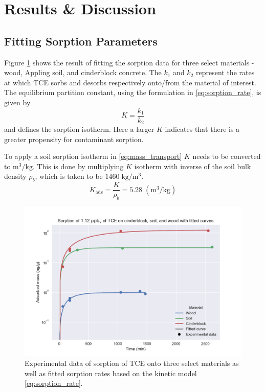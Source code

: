 \section{Results \& Discussion}\label{sec:results}

\subsection{Fitting Sorption Parameters}\label{sec:results_sorption_fit}
Figure \ref{fig:sorption_fit} shows the result of fitting the sorption data for three select materials - wood, Appling soil, and cinderblock concrete.
The $k_1$ and $k_2$ represent the rates at which TCE sorbs and desorbs respectively onto/from the material of interest.
The equilibrium partition constant, using the formulation in \eqref{eq:sorption_rate}, is given by
\begin{equation}
  K = \frac{k_1}{k_2}
\end{equation}
and defines the sorption isotherm.
Here a larger $K$ indicates that there is a greater propensity for contaminant sorption.\par

To apply a soil sorption isotherm in \eqref{eq:mass_transport} $K$ needs to be converted to $\mathrm{m^3/kg}$.
This is done by multiplying $K$ isotherm with inverse of the soil bulk density $\rho_b$, which is taken to be $1460 \; \mathrm{kg/m^3}$\cite{u.s._environmental_protection_agency_userss_2004}.
\begin{equation}
  K_\mathrm{ads} = \frac{K}{\rho_b} = 5.28 \; \mathrm{(m^3/kg)}
\end{equation}

\begin{figure}[htb!]
  \includegraphics[width=\textwidth]{sorption_fit.pdf}
  \caption{Experimental data of sorption of TCE onto three select materials as well as fitted sorption rates based on the kinetic model \eqref{eq:sorption_rate}.}
  \label{fig:sorption_fit}
\end{figure}

